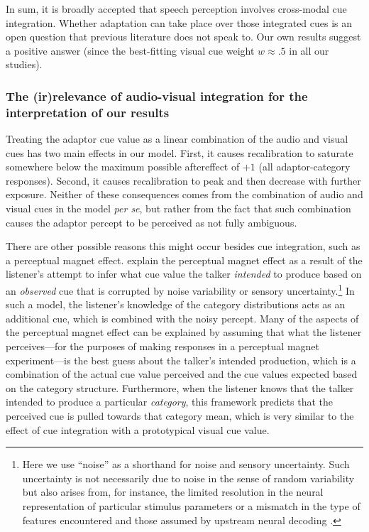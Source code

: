 In sum, it is broadly accepted that speech perception involves cross-modal cue integration. Whether adaptation can take place over those integrated cues is an open question that previous literature does not speak to. Our own results suggest a positive answer (since the best-fitting visual cue weight $w \approx .5$ in all our studies). 


\subsubsection{The (ir)relevance of audio-visual integration for the interpretation of our results}
\label{sec:import-audio-visu}

Treating the adaptor cue value as a linear combination of the audio and visual cues has two main effects in our model.  First, it causes recalibration to saturate somewhere below the maximum possible aftereffect of $+1$ (all adaptor-category responses).  Second, it causes recalibration to peak and then decrease with further exposure.  Neither of these consequences comes from the combination of audio and visual cues in the model \emph{per se}, but rather from the fact that such combination causes the adaptor percept to be perceived as not fully ambiguous.

There are other possible reasons this might occur besides cue integration, such as a perceptual magnet effect.  \textcite{Feldman2009a} explain the perceptual magnet effect as a result of the listener's attempt to infer what cue value the talker \emph{intended} to produce based on an \emph{observed} cue that is corrupted by noise variability or sensory uncertainty.\footnote{Here we use ``noise'' as a shorthand for noise and sensory uncertainty.  Such uncertainty is not necessarily due to noise in the sense of random variability but also arises from, for instance, the limited resolution in the neural representation of particular stimulus parameters or a mismatch in the type of features encountered and those assumed by upstream neural decoding \protect\autocite{Beck2012}.}  In such a model, the listener's knowledge of the category distributions acts as an additional cue, which is combined with the noisy percept.  Many of the aspects of the perceptual magnet effect can be explained by assuming that what the listener perceives---for the purposes of making responses in a perceptual magnet experiment---is the best guess about the talker's intended production, which is a combination of the actual cue value perceived and the cue values expected based on the category structure.  Furthermore, when the listener knows that the talker intended to produce a particular \emph{category}, this framework predicts that the perceived cue is pulled towards that category mean, which is very similar to the effect of cue integration with a prototypical visual cue value.

